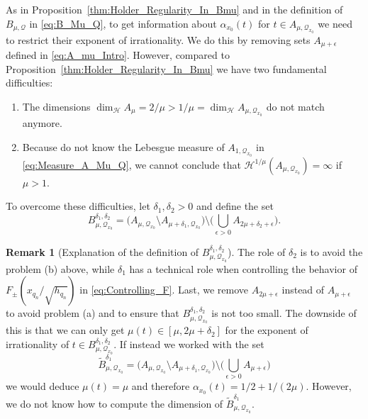 \documentclass[11pt,reqno]{amsart}
\theoremstyle{definition}
\newtheorem{rem}[thm]{Remark}
\begin{document}
As in Proposition~\ref{thm:Holder_Regularity_In_Bmu} and in the definition of $B_{\mu,\mathcal Q}$ in \eqref{eq:B_Mu_Q}, 
to get information about $\alpha_{x_0}(t)$ for $t \in A_{\mu,\mathcal Q_{x_0}}$
we need to restrict their exponent of irrationality.  
We do this by removing sets $A_{\mu + \epsilon}$ defined in \eqref{eq:A_mu_Intro}. 
However, compared to Proposition~\ref{thm:Holder_Regularity_In_Bmu} we have two fundamental difficulties:
\begin{enumerate}
	\item[(a)] The dimensions $\operatorname{dim}_{\mathcal H} A_\mu = 2/\mu > 1/\mu =  \operatorname{dim}_{\mathcal H} A_{\mu,\mathcal Q_{x_0}}$  do not match anymore.  
	\item[(b)] Because do not know the Lebesgue measure of $A_{1,\mathcal Q_{x_0}}$ 
in \eqref{eq:Measure_A_Mu_Q}, 
we cannot conclude that 
$\mathcal H^{1/\mu} (A_{\mu,\mathcal Q_{x_0}}) = \infty$ if $\mu > 1$. 
\end{enumerate}
To overcome these difficulties, 
let $\delta_1, \delta_2 > 0$ and define the set 
\begin{equation}\label{eq:B_Mu_Q_x0}
B_{\mu, \mathcal Q_{x_0}} ^{\delta_1, \delta_2}
= \Big(  A_{\mu, \mathcal Q_{x_0}} \setminus A_{\mu + \delta_1,\mathcal Q_{x_0}}  \Big) 
 \setminus \Big( \bigcup_{\epsilon >0} A_{2\mu + \delta_2 + \epsilon} \Big).
\end{equation}

\begin{rem}[Explanation of the definition of $B_{\mu, \mathcal Q_{x_0}} ^{\delta_1, \delta_2}$]\label{rmk:Good_Diophantine_Set}
The role of $\delta_2$ is to avoid the problem (b) above, 
while $\delta_1$ has a technical role when controlling the behavior of $F_\pm(x_{q_n}/\sqrt{h_{q_n}})$ in \eqref{eq:Controlling_F}.
Last, 
we remove $A_{2\mu+\epsilon}$ instead of $A_{\mu + \epsilon}$
to avoid problem (a) and to ensure that $B_{\mu, \mathcal Q_{x_0}} ^{\delta_1, \delta_2}$ is not too small.
The downside of this is that we can only get $\mu(t) \in [\mu, 2\mu + \delta_2]$ for the exponent of irrationality of $t \in B_{\mu, \mathcal Q_{x_0}} ^{\delta_1, \delta_2}$. 
If instead we worked with the set
\begin{equation}\label{eq:B_s_Q_x0_Tilde}
\widetilde B_{\mu, \mathcal Q_{x_0}}^{\delta_1}
=  \Big(  A_{\mu, \mathcal Q_{x_0}} \setminus A_{\mu + \delta_1,\mathcal Q_{x_0}}  \Big)  \setminus \Big( \bigcup_{\epsilon >0} A_{\mu + \epsilon} \Big)
\end{equation}
we would deduce $\mu(t) =\mu$ and therefore $\alpha_{x_0}(t) = 1/2 + 1/(2\mu)$. 
However, we do not know how to compute the dimension of $\widetilde B^{\delta_1}_{\mu, \mathcal Q_{x_0}}$.

\end{rem}
\end{document}
